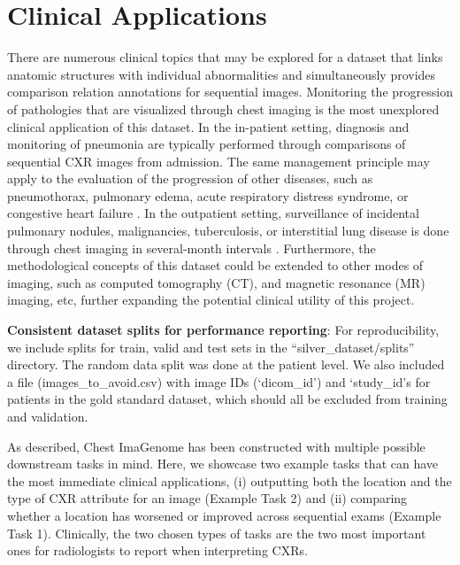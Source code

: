\vspace{-5pt}
\section*{Clinical Applications}
\vspace{-5pt}
There are numerous clinical topics that may be explored for a dataset that links anatomic structures with individual abnormalities and simultaneously provides comparison relation annotations for sequential images. Monitoring the progression of pathologies that are visualized through chest imaging is the most unexplored clinical application of this dataset. In the in-patient setting, diagnosis and monitoring of pneumonia are typically performed through comparisons of sequential CXR images from admission\cite{kalil2016management}. The same management principle may apply to the evaluation of the progression of other diseases, such as pneumothorax, pulmonary edema, acute respiratory distress syndrome, or congestive heart failure \cite{henry2003bts, cardinale2014effectiveness, rubenfeld2012acute}. In the outpatient setting, surveillance of incidental pulmonary nodules, malignancies, tuberculosis, or interstitial lung disease is done through chest imaging in several-month intervals \cite{gould2013evaluation, koo2019chest, nahid2016official, hansell2015ct}. Furthermore, the methodological concepts of this dataset could be extended to other modes of imaging, such as computed tomography (CT), and magnetic resonance (MR) imaging, etc, further expanding the potential clinical utility of this project.


\textbf{Consistent dataset splits for performance reporting}: For reproducibility, we include splits for train, valid and test sets in the ``silver\_dataset/splits'' directory. The random data split was done at the patient level. We also included a file (images\_to\_avoid.csv) with image IDs (`dicom\_id') and `study\_id's for patients in the gold standard dataset, which should all be excluded from training and validation. 

As described, Chest ImaGenome has been constructed with multiple possible downstream tasks in mind. Here, we showcase two example tasks that can have the most immediate clinical applications, (i) outputting both the location and the type of CXR attribute for an image (Example Task 2) and (ii) comparing whether a location has worsened or improved across sequential exams (Example Task 1). Clinically, the two chosen types of tasks are the two most important ones for radiologists to report when interpreting CXRs. 



